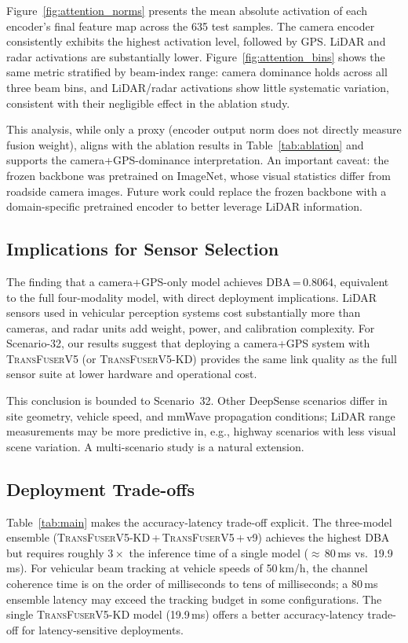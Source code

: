 \documentclass[journal,10pt,twoside]{IEEEtran}
\newcommand{\ours}{\textsc{TransFuserV5}}
\newcommand{\distill}{\textsc{TransFuserV5-KD}}
\begin{document}
Figure~\ref{fig:attention_norms} presents the mean absolute activation of each
encoder's final feature map across the 635 test samples. The camera encoder
consistently exhibits the highest activation level, followed by GPS. LiDAR and
radar activations are substantially lower. Figure~\ref{fig:attention_bins}
shows the same metric stratified by beam-index range: camera dominance holds
across all three beam bins, and LiDAR/radar activations show little systematic
variation, consistent with their negligible effect in the ablation study.

This analysis, while only a proxy (encoder output norm does not directly
measure fusion weight), aligns with the ablation results in
Table~\ref{tab:ablation} and supports the camera+GPS-dominance interpretation.
An important caveat: the frozen backbone was pretrained on ImageNet, whose
visual statistics differ from roadside camera images. Future work could
replace the frozen backbone with a domain-specific pretrained encoder to
better leverage LiDAR information.

\subsection{Implications for Sensor Selection}

The finding that a camera+GPS-only model achieves DBA\,=\,0.8064, equivalent to the full four-modality model, with direct deployment implications. LiDAR sensors
used in vehicular perception systems cost substantially more than cameras,
and radar units add weight, power, and calibration complexity. For
Scenario-32, our results suggest that deploying a camera+GPS system with
\ours{} (or \distill{}) provides the same link quality as the full sensor
suite at lower hardware and operational cost.

This conclusion is bounded to Scenario~32. Other DeepSense scenarios differ
in site geometry, vehicle speed, and mmWave propagation conditions; LiDAR
range measurements may be more predictive in, e.g., highway scenarios with
less visual scene variation. A multi-scenario study is a natural extension.

\subsection{Deployment Trade-offs}

Table~\ref{tab:main} makes the accuracy-latency trade-off explicit. The
three-model ensemble (\distill{}\,+\,\ours{}\,+\,v9) achieves the highest DBA
but requires roughly $3\times$ the inference time of a single model
($\approx$\,80\,ms vs.\ 19.9\,ms). For vehicular beam tracking at vehicle
speeds of 50\,km/h, the channel coherence time is on the order of milliseconds
to tens of milliseconds; a 80\,ms ensemble latency may exceed the
tracking budget in some configurations. The single \distill{} model (19.9\,ms)
offers a better accuracy-latency trade-off for latency-sensitive deployments.
\end{document}

